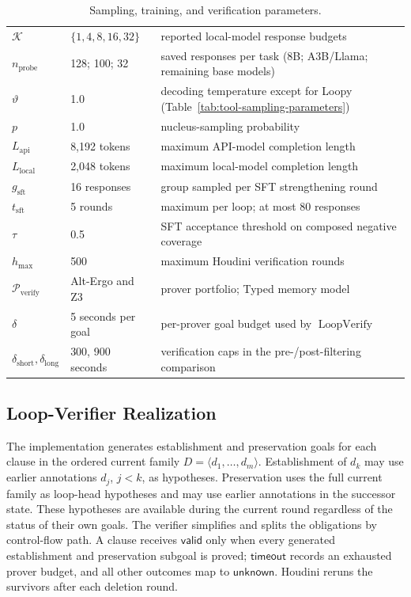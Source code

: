 \begin{table}[H]
\begin{tabular}{p{2.6cm}p{3.1cm}p{5.9cm}}
\(\mathcal K\) & \(\{1,4,8,16,32\}\) & reported local-model response budgets \\
\(n_{\mathrm{probe}}\) & 128; 100; 32 & saved responses per task (8B; A3B/Llama; remaining base models) \\
\(\vartheta\) & 1.0 & decoding temperature except for Loopy (Table~\ref{tab:tool-sampling-parameters}) \\
\(p\) & 1.0 & nucleus-sampling probability \\
\(L_{\mathrm{api}}\) & 8,192 tokens & maximum API-model completion length \\
\(L_{\mathrm{local}}\) & 2,048 tokens & maximum local-model completion length \\
\midrule
\(g_{\mathrm{sft}}\) & 16 responses & group sampled per SFT strengthening round \\
\(t_{\mathrm{sft}}\) & 5 rounds & maximum per loop; at most 80 responses \\
\(\tau\) & 0.5 & SFT acceptance threshold on composed negative coverage \\
\midrule
\(h_{\max}\) & 500 & maximum Houdini verification rounds \\
\(\mathcal P_{\mathrm{verify}}\) & Alt-Ergo and Z3 & prover portfolio; Typed memory model \\
\(\delta\) & 5 seconds per goal & per-prover goal budget used by \(\operatorname{LoopVerify}\) \\
\(\delta_{\mathrm{short}},\delta_{\mathrm{long}}\) & 300, 900 seconds & verification caps in the pre-/post-filtering comparison \\
\bottomrule
\end{tabular}
\caption{Sampling, training, and verification parameters.}
\label{tab:constants}
\end{table}
\subsection{Loop-Verifier Realization}
\label{app:loop-verifier-realization}

The implementation generates establishment and preservation goals for each
clause in the ordered current family \(D=\langle d_1,\ldots,d_m\rangle\).
Establishment of \(d_k\) may use earlier annotations \(d_j\), \(j<k\), as
hypotheses.  Preservation uses the full current family as loop-head
hypotheses and may use earlier annotations in the successor state.  These
hypotheses are available during the current round regardless of the status of
their own goals.  The verifier simplifies and splits the obligations by
control-flow path.  A clause receives \(\mathsf{valid}\) only when every
generated establishment and preservation subgoal is proved;
\(\mathsf{timeout}\) records an exhausted prover budget, and all other
outcomes map to \(\mathsf{unknown}\).  Houdini reruns the survivors after each
deletion round.

